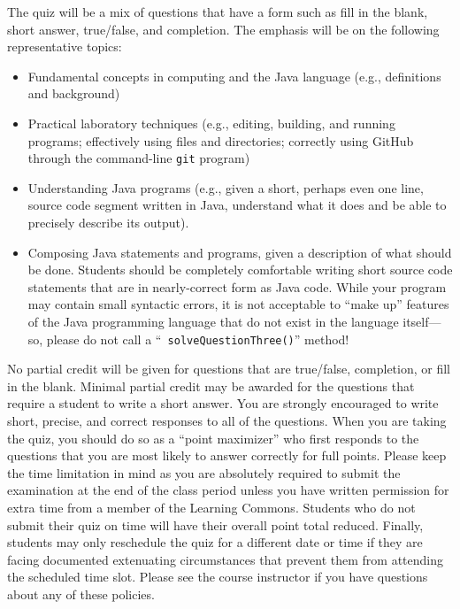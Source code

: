 \documentclass[11pt]{article}
\begin{document}
\noindent The quiz will be a mix of questions that have a form such as fill in
the blank, short answer, true/false, and completion. The emphasis will be on the
following representative topics:

\vspace*{-.05in}
\begin{itemize}

  \itemsep 0in

  \item Fundamental concepts in computing and the Java language (e.g.,
    definitions and background)

  \item Practical laboratory techniques (e.g., editing, building, and running
    programs; effectively using files and directories; correctly using GitHub
    through the command-line {\tt git} program)

  \item Understanding Java programs (e.g., given a short, perhaps even one line,
    source code segment written in Java, understand what it does and be able to
    precisely describe its output).

  \item Composing Java statements and programs, given a description of what
    should be done. Students should be completely comfortable writing short
    source code statements that are in nearly-correct form as Java code. While
    your program may contain small syntactic errors, it is not acceptable to
    ``make up'' features of the Java programming language that do not exist in
    the language itself---so, please do not call a ``{\tt
    solveQuestionThree()}'' method!

\end{itemize}

\noindent No partial credit will be given for questions that are true/false,
completion, or fill in the blank. Minimal partial credit may be awarded for the
questions that require a student to write a short answer. You are strongly
encouraged to write short, precise, and correct responses to all of the
questions. When you are taking the quiz, you should do so as a ``point
maximizer'' who first responds to the questions that you are most likely to
answer correctly for full points. Please keep the time limitation in mind as you
are absolutely required to submit the examination at the end of the class period
unless you have written permission for extra time from a member of the Learning
Commons. Students who do not submit their quiz on time will have their overall
point total reduced. Finally, students may only reschedule the quiz for a
different date or time if they are facing documented extenuating circumstances
that prevent them from attending the scheduled time slot. Please see the course
instructor if you have questions about any of these policies.
\end{document}
